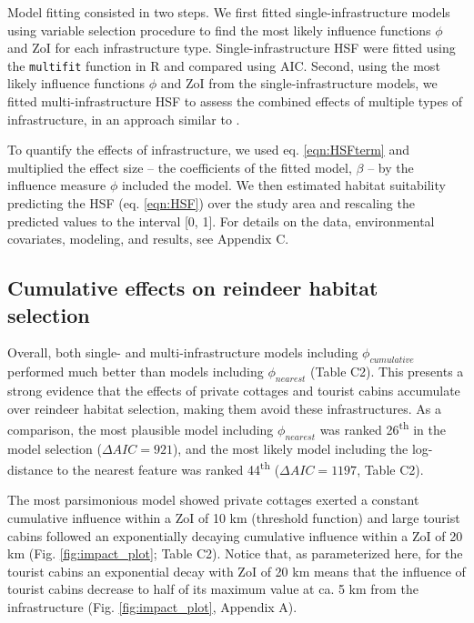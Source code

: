 \documentclass[titlepage]{article}
\begin{document}
{Model fitting consisted in two steps. We first fitted single-infrastructure models using variable selection procedure \citep{burnham_model_2002} to find the most likely influence functions $\phi$ and ZoI for each infrastructure type. Single-infrastructure HSF were fitted using the \verb|multifit| function in R \citep{huais_multifit_2018} and compared using AIC. Second, using the most likely influence functions $\phi$ and ZoI from the single-infrastructure models, we fitted multi-infrastructure HSF to assess the combined effects of multiple types of infrastructure, in an approach similar to \citet{laforge_process-focussed_2015}. 

To quantify the effects of infrastructure, we used eq. \ref{eqn:HSFterm} and multiplied the effect size -- the coefficients of the fitted model, $\beta$ -- by the influence measure $\phi$ included the model. We then estimated habitat suitability predicting the HSF (eq. \ref{eqn:HSF}) over the study area and rescaling the predicted values to the interval [0, 1]. For details on the data, environmental covariates, modeling, and results, see Appendix C.

\subsection{Cumulative effects on reindeer habitat selection}

Overall, both single- and multi-infrastructure models including $\phi_{cumulative}$ performed much better than models including $\phi_{nearest}$ (Table C2). This presents a strong evidence that the effects of private cottages and tourist cabins accumulate over reindeer habitat selection, making them avoid these infrastructures. As a comparison, the most plausible model including $\phi_{nearest}$ was ranked 26\textsuperscript{th} in the model selection ($\Delta AIC = 921$), and the most likely model including the log-distance to the nearest feature was ranked 44\textsuperscript{th} ($\Delta AIC = 1197$, Table C2).

The most parsimonious model showed private cottages exerted a constant cumulative influence within a ZoI of 10 km (threshold function) and large tourist cabins followed an exponentially decaying cumulative influence within a ZoI of 20 km (Fig. \ref{fig:impact_plot}; Table C2). Notice that, as parameterized here, for the tourist cabins an exponential decay with ZoI of 20 km means
that the influence of tourist cabins decrease to half of its maximum value
at ca. 5 km from the infrastructure (Fig. \ref{fig:impact_plot}, Appendix A). 

}
\end{document}
